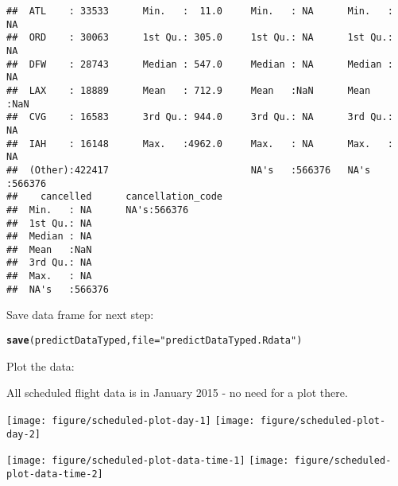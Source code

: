 \documentclass{article}\usepackage[]{graphicx}\usepackage[]{color}
\makeatletter
\newcommand{\hlstr}[1]{\textcolor[rgb]{0.192,0.494,0.8}{#1}}%
\newcommand{\hlstd}[1]{\textcolor[rgb]{0.345,0.345,0.345}{#1}}%
\newcommand{\hlkwc}[1]{\textcolor[rgb]{0.333,0.667,0.333}{#1}}%
\newcommand{\hlkwd}[1]{\textcolor[rgb]{0.737,0.353,0.396}{\textbf{#1}}}%
\newenvironment{kframe}{%
 \def\at@end@of@kframe{}%
 \ifinner\ifhmode%
  \def\at@end@of@kframe{\end{minipage}}%
  \begin{minipage}{\columnwidth}%
 \fi\fi%
 \def\FrameCommand##1{\hskip\@totalleftmargin \hskip-\fboxsep
 \colorbox{shadecolor}{##1}\hskip-\fboxsep
     \hskip-\linewidth \hskip-\@totalleftmargin \hskip\columnwidth}%
 \MakeFramed {\advance\hsize-\width
   \@totalleftmargin\z@ \linewidth\hsize
   \@setminipage}}%
 {\par\unskip\endMakeFramed%
 \at@end@of@kframe}
\newenvironment{knitrout}{}{} %
\makeatother
\begin{document}
\begin{knitrout}
\begin{kframe}
\begin{verbatim}
##  ATL    : 33533      Min.   :  11.0     Min.   : NA      Min.   : NA     
##  ORD    : 30063      1st Qu.: 305.0     1st Qu.: NA      1st Qu.: NA     
##  DFW    : 28743      Median : 547.0     Median : NA      Median : NA     
##  LAX    : 18889      Mean   : 712.9     Mean   :NaN      Mean   :NaN     
##  CVG    : 16583      3rd Qu.: 944.0     3rd Qu.: NA      3rd Qu.: NA     
##  IAH    : 16148      Max.   :4962.0     Max.   : NA      Max.   : NA     
##  (Other):422417                         NA's   :566376   NA's   :566376  
##    cancelled      cancellation_code
##  Min.   : NA      NA's:566376      
##  1st Qu.: NA                       
##  Median : NA                       
##  Mean   :NaN                       
##  3rd Qu.: NA                       
##  Max.   : NA                       
##  NA's   :566376
\end{verbatim}
\end{kframe}
\end{knitrout}

Save data frame for next step:
\begin{knitrout}
\color{fgcolor}\begin{kframe}
\begin{alltt}
\hlkwd{save}\hlstd{(predictDataTyped,} \hlkwc{file}\hlstd{=}\hlstr{"predictDataTyped.Rdata"}\hlstd{)}
\end{alltt}
\end{kframe}
\end{knitrout}



Plot the data:



All scheduled flight data is in January 2015 - no need for a plot there.

\begin{knitrout}
\color{fgcolor}

{\centering \texttt{[image: figure/scheduled-plot-day-1]} 
\texttt{[image: figure/scheduled-plot-day-2]} 

}



\end{knitrout}

\begin{knitrout}
\color{fgcolor}

{\centering \texttt{[image: figure/scheduled-plot-data-time-1]} 
\texttt{[image: figure/scheduled-plot-data-time-2]} 

}



\end{knitrout}
\end{document}
